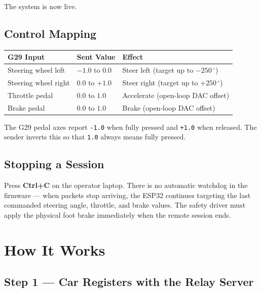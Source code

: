 ﻿\documentclass[12pt, letterpaper]{article}
\begin{document}
The system is now live.

\subsection{Control Mapping}

\begin{center}
\begin{tabular}{lll}
  \toprule
  \textbf{G29 Input} & \textbf{Sent Value} & \textbf{Effect}\\
  \midrule
  Steering wheel left  & $-1.0$ to $0.0$ & Steer left (target up to $-250\,^\circ$)\\
  Steering wheel right & $0.0$ to $+1.0$ & Steer right (target up to $+250\,^\circ$)\\
  Throttle pedal       & $0.0$ to $1.0$  & Accelerate (open-loop DAC offset)\\
  Brake pedal          & $0.0$ to $1.0$  & Brake (open-loop DAC offset)\\
  \bottomrule
\end{tabular}
\end{center}

\begin{notebox}
The G29 pedal axes report \texttt{-1.0} when fully pressed and \texttt{+1.0} when
released.  The sender inverts this so that \texttt{1.0} always means fully pressed.
\end{notebox}

\subsection{Stopping a Session}

Press \textbf{Ctrl+C} on the operator laptop.  There is no automatic watchdog in the
firmware --- when packets stop arriving, the ESP32 continues targeting the last
commanded steering angle, throttle, and brake values.  The safety driver must apply
the physical foot brake immediately when the remote session ends.

\section{How It Works}

\subsection{Step 1 --- Car Registers with the Relay Server}
\end{document}
